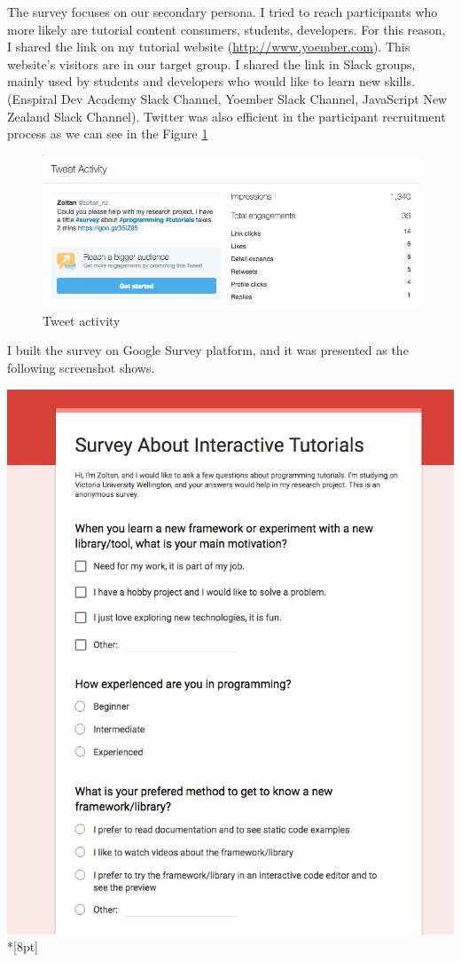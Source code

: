 \documentclass[11pt, a4paper, oneside, openright, medskipamount]{report}
\begin{document}
The survey focuses on our secondary persona. I tried to reach participants who more likely are tutorial content consumers, students, developers. For this reason, I shared the link on my tutorial website (\url{http://www.yoember.com}). This website's visitors are in our target group. I shared the link in Slack groups, mainly used by students and developers who would like to learn new skills. (Enspiral Dev Academy Slack Channel, Yoember Slack Channel, JavaScript New Zealand Slack Channel). Twitter was also efficient in the participant recruitment process as we can see in the Figure \ref{fig:twitter}

\begin{figure}[htbp]
\centering
\includegraphics[width=1\textwidth]{assets/tweet-activity.png}
\caption{Tweet activity}
\label{fig:twitter}
\end{figure}

I built the survey on Google Survey platform, and it was presented as the following screenshot shows.

\includegraphics[width=1\textwidth]{assets/survey-screenshot.png}\\*[8pt]
\end{document}
